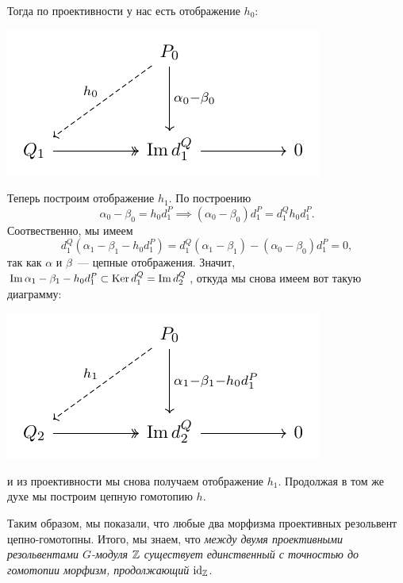 	Тогда по проективности у нас есть отображение $h_0$:
	\begin{center}
		\includegraphics{lectures/6/pictures/cd_4.pdf}
	\end{center}

	Теперь построим отображение $h_1$. По построению 
	\[
		\alpha_0 - \beta_0 = h_0 d_{1}^P  \implies (\alpha_0 - \beta_0)d_1^P = d_1^Q h_0 d_1^P.
	\]
	Соотвественно, мы имеем 
	\[
		d_1^Q (\alpha_1 - \beta_1 - h_0 d_1^P) = d_1^Q(\alpha_1 - \beta_1) - (\alpha_0 - \beta_0)d_1^P = 0, 
	\]
	так как $\alpha$ и $\beta$~--- цепные отображения. Значит, $\mathop{\mathrm{Im}}\nolimits{\alpha_1 - \beta_1 - h_0 d_1^P} \subset \operatorname{Ker}{d_1^Q} = \mathop{\mathrm{Im}}\nolimits{d_2^Q}$, откуда мы снова имеем вот такую диаграмму: 
	\begin{center}
		\includegraphics{lectures/6/pictures/cd_5.pdf}
	\end{center}
	и из проективности мы снова получаем отображение $h_1$. Продолжая в том же духе мы построим цепную гомотопию $h$.
 	
 	\begin{remark}
 		Таким образом, мы показали, что любые два морфизма проективных резольвент цепно-гомотопны. Итого, мы знаем, что \emph{между двумя проективными резольвентами $G$-модуля $\mathbb{Z}$ существует единственный с точностью до гомотопии морфизм, продолжающий $\mathrm{id}_{\mathbb{Z}}$}. 	
 	\end{remark}
	
	

